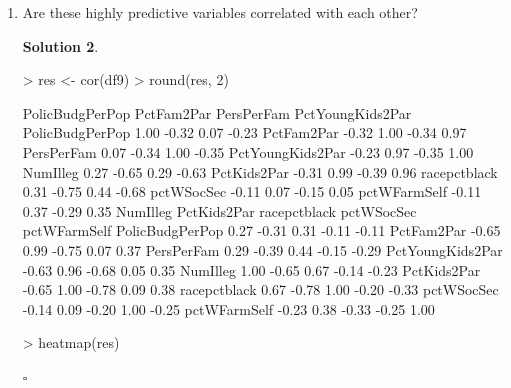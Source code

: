\documentclass[twoside]{article}
\theoremstyle{definition}
\newtheorem*{solutionT}{Solution}
\newenvironment{solution}{\begin{cBox}\begin{solutionT}}{\hfill{\scriptsize\ensuremath{\square}}\end{solutionT}\end{cBox}}
\theoremstyle{definition}
\begin{document}
\begin{enumerate}
\begin{solution}
\end{solution}
\item Are these highly predictive variables correlated with each other?
\begin{solution}
\begin{Schunk}
\begin{Sinput}
> res <- cor(df9)
> round(res, 2)
\end{Sinput}
\begin{Soutput}
                 PolicBudgPerPop PctFam2Par PersPerFam PctYoungKids2Par
PolicBudgPerPop             1.00      -0.32       0.07            -0.23
PctFam2Par                 -0.32       1.00      -0.34             0.97
PersPerFam                  0.07      -0.34       1.00            -0.35
PctYoungKids2Par           -0.23       0.97      -0.35             1.00
NumIlleg                    0.27      -0.65       0.29            -0.63
PctKids2Par                -0.31       0.99      -0.39             0.96
racepctblack                0.31      -0.75       0.44            -0.68
pctWSocSec                 -0.11       0.07      -0.15             0.05
pctWFarmSelf               -0.11       0.37      -0.29             0.35
                 NumIlleg PctKids2Par racepctblack pctWSocSec pctWFarmSelf
PolicBudgPerPop      0.27       -0.31         0.31      -0.11        -0.11
PctFam2Par          -0.65        0.99        -0.75       0.07         0.37
PersPerFam           0.29       -0.39         0.44      -0.15        -0.29
PctYoungKids2Par    -0.63        0.96        -0.68       0.05         0.35
NumIlleg             1.00       -0.65         0.67      -0.14        -0.23
PctKids2Par         -0.65        1.00        -0.78       0.09         0.38
racepctblack         0.67       -0.78         1.00      -0.20        -0.33
pctWSocSec          -0.14        0.09        -0.20       1.00        -0.25
pctWFarmSelf        -0.23        0.38        -0.33      -0.25         1.00
\end{Soutput}
\begin{Sinput}
> heatmap(res)
\end{Sinput}
\end{Schunk}

\end{solution}
\end{enumerate}
\end{document}

